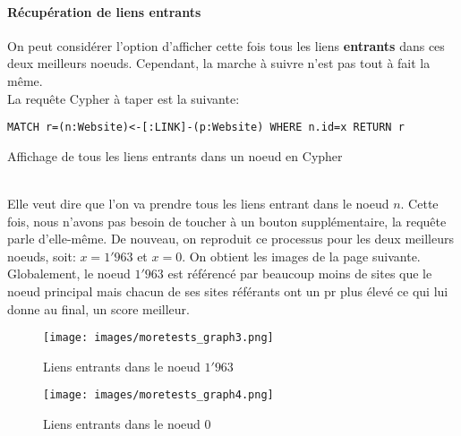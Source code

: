 \documentclass[12pt,twoside, openright]{memoir}
\begin{document}
	\paragraph*{Récupération de liens entrants} On peut considérer l'option d'afficher cette fois tous les liens \textbf{entrants} dans ces deux meilleurs noeuds. Cependant, la marche à suivre n'est pas tout à fait la même.\\
	La requête Cypher à taper est la suivante:
	\begin{listing}
		\begin{verbatim}
MATCH r=(n:Website)<-[:LINK]-(p:Website) WHERE n.id=x RETURN r
		\end{verbatim}
		\caption{Affichage de tous les liens entrants dans un noeud en Cypher}
	\end{listing}\\
	Elle veut dire que l'on va prendre tous les liens entrant dans le noeud $n$. Cette fois, nous n'avons pas besoin de toucher à un bouton supplémentaire, la requête parle d'elle-même. De nouveau, on reproduit ce processus pour les deux meilleurs noeuds, soit: $x=1'963$ et $x=0$. On obtient les images de la page suivante.\\
	Globalement, le noeud $1'963$ est référencé par beaucoup moins de sites que le noeud principal mais chacun de ses sites référants ont un \gls{pr} plus élevé ce qui lui donne au final, un score meilleur.\newpage
	\begin{figure}[!ht]
		\centering
		\texttt{[image: images/moretests\_graph3.png]}
		\caption{Liens entrants dans le noeud $1'963$}
	\end{figure}
	\begin{figure}[!ht]
		\centering
		\texttt{[image: images/moretests\_graph4.png]}
		\caption{Liens entrants dans le noeud $0$}
	\end{figure}\newpage
\end{document}
